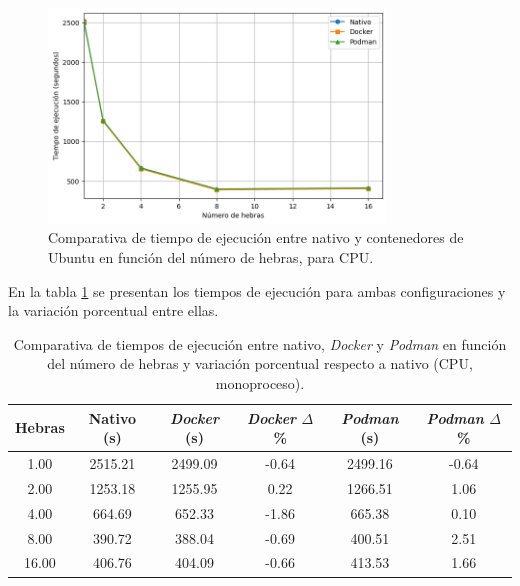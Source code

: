 \begin{figure}[H]
    \centering
    \includegraphics[width=0.8\textwidth]{imagenes/cap5/single-node_ubuntu_container_vs_native_time.png}
    \caption{Comparativa de tiempo de ejecución entre nativo y contenedores de Ubuntu en función del número de hebras, para CPU.}
    \label{fig:single-node_ubuntu_container_vs_native_time}
\end{figure}

En la tabla \ref{tab:single-node_ubuntu_container_vs_native} se presentan los tiempos de ejecución para ambas configuraciones y la variación porcentual entre ellas.

\begin{table}[ht]
    \centering
    \begin{tabular}{|c|c|c|c|c|c|}
        \hline
        \textbf{Hebras} & \textbf{Nativo (s)} & \textbf{\textit{Docker} (s)} & \textbf{\textit{Docker} $\Delta$\%} & \textbf{\textit{Podman} (s)} & \textbf{\textit{Podman} $\Delta$\%} \\
        \hline
        1.00            & 2515.21             & 2499.09                      & -0.64                               & 2499.16                      & -0.64                               \\
        2.00            & 1253.18             & 1255.95                      & 0.22                                & 1266.51                      & 1.06                                \\
        4.00            & 664.69              & 652.33                       & -1.86                               & 665.38                       & 0.10                                \\
        8.00            & 390.72              & 388.04                       & -0.69                               & 400.51                       & 2.51                                \\
        16.00           & 406.76              & 404.09                       & -0.66                               & 413.53                       & 1.66                                \\
        \hline
    \end{tabular}
    \caption{Comparativa de tiempos de ejecución entre nativo, \textit{Docker} y \textit{Podman} en función del número de hebras y variación porcentual respecto a nativo (CPU, monoproceso).}
    \label{tab:single-node_ubuntu_container_vs_native}
\end{table}

